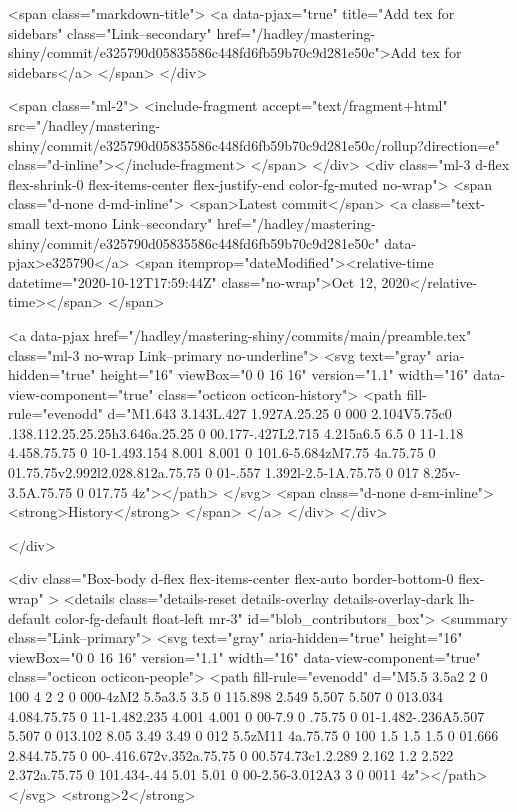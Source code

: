               <span class="markdown-title">
                <a data-pjax="true" title="Add tex for sidebars" class="Link--secondary" href="/hadley/mastering-shiny/commit/e325790d05835586c448fd6fb59b70c9d281e50c">Add tex for sidebars</a>
              </span>
          </div>


          <span class="ml-2">
            <include-fragment accept="text/fragment+html" src="/hadley/mastering-shiny/commit/e325790d05835586c448fd6fb59b70c9d281e50c/rollup?direction=e" class="d-inline"></include-fragment>
          </span>
        </div>
        <div class="ml-3 d-flex flex-shrink-0 flex-items-center flex-justify-end color-fg-muted no-wrap">
          <span class="d-none d-md-inline">
            <span>Latest commit</span>
            <a class="text-small text-mono Link--secondary" href="/hadley/mastering-shiny/commit/e325790d05835586c448fd6fb59b70c9d281e50c" data-pjax>e325790</a>
            <span itemprop="dateModified"><relative-time datetime="2020-10-12T17:59:44Z" class="no-wrap">Oct 12, 2020</relative-time></span>
          </span>

          <a data-pjax href="/hadley/mastering-shiny/commits/main/preamble.tex" class="ml-3 no-wrap Link--primary no-underline">
            <svg text="gray" aria-hidden="true" height="16" viewBox="0 0 16 16" version="1.1" width="16" data-view-component="true" class="octicon octicon-history">
    <path fill-rule="evenodd" d="M1.643 3.143L.427 1.927A.25.25 0 000 2.104V5.75c0 .138.112.25.25.25h3.646a.25.25 0 00.177-.427L2.715 4.215a6.5 6.5 0 11-1.18 4.458.75.75 0 10-1.493.154 8.001 8.001 0 101.6-5.684zM7.75 4a.75.75 0 01.75.75v2.992l2.028.812a.75.75 0 01-.557 1.392l-2.5-1A.75.75 0 017 8.25v-3.5A.75.75 0 017.75 4z"></path>
</svg>
            <span class="d-none d-sm-inline">
              <strong>History</strong>
            </span>
          </a>
        </div>
      </div>

  </div>

  <div class="Box-body d-flex flex-items-center flex-auto border-bottom-0 flex-wrap" >
    <details class="details-reset details-overlay details-overlay-dark lh-default color-fg-default float-left mr-3" id="blob_contributors_box">
      <summary class="Link--primary">
        <svg text="gray" aria-hidden="true" height="16" viewBox="0 0 16 16" version="1.1" width="16" data-view-component="true" class="octicon octicon-people">
    <path fill-rule="evenodd" d="M5.5 3.5a2 2 0 100 4 2 2 0 000-4zM2 5.5a3.5 3.5 0 115.898 2.549 5.507 5.507 0 013.034 4.084.75.75 0 11-1.482.235 4.001 4.001 0 00-7.9 0 .75.75 0 01-1.482-.236A5.507 5.507 0 013.102 8.05 3.49 3.49 0 012 5.5zM11 4a.75.75 0 100 1.5 1.5 1.5 0 01.666 2.844.75.75 0 00-.416.672v.352a.75.75 0 00.574.73c1.2.289 2.162 1.2 2.522 2.372a.75.75 0 101.434-.44 5.01 5.01 0 00-2.56-3.012A3 3 0 0011 4z"></path>
</svg>
        <strong>2</strong>
        
